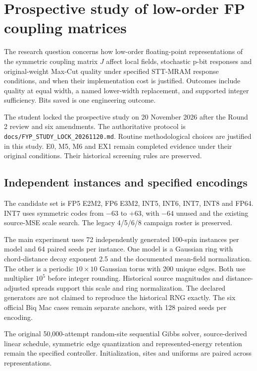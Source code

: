 \section{Prospective study of low-order FP coupling matrices}
\label{sec:prospective-design}

The research question concerns how low-order floating-point
representations of the symmetric coupling matrix $J$ affect local
fields, stochastic p-bit responses and original-weight Max-Cut
quality under specified STT-MRAM response conditions, and when their
implementation cost is justified. Outcomes include quality at equal
width, a named lower-width replacement, and supported integer
sufficiency. Bits saved is one engineering outcome.

The student locked the prospective study on 20 November 2026 after
the Round 2 review and six amendments. The authoritative protocol is
\texttt{docs/FYP\_STUDY\_LOCK\_20261120.md}. Routine methodological
choices are justified in this study. E0, M5, M6 and EX1 remain
completed evidence under their original conditions. Their historical
screening rules are preserved.

\subsection{Independent instances and specified encodings}
The candidate set is FP5 E2M2, FP6 E3M2, INT5, INT6, INT7, INT8 and
FP64. INT7 uses symmetric codes from $-63$ to $+63$, with $-64$
unused and the existing source-MSE scale search. The legacy
4/5/6/8 campaign roster is preserved.

The main experiment uses 72 independently generated 100-spin
instances per model and 64 paired seeds per instance. One model is a
Gaussian ring with chord-distance decay exponent 2.5 and the
documented mean-field normalization. The other is a periodic
$10\times10$ Gaussian torus with 200 unique edges. Both use multiplier
$10^5$ before integer rounding. Historical source magnitudes and
distance-adjusted spreads support this scale and ring normalization.
The declared generators are not claimed to reproduce the historical
RNG exactly. The six official Biq Mac cases remain separate anchors,
with 128 paired seeds per encoding.

The original 50,000-attempt random-site sequential Gibbs solver,
source-derived linear schedule, symmetric edge quantization and
represented-energy retention remain the specified controller.
Initialization, sites and uniforms are paired across representations.

